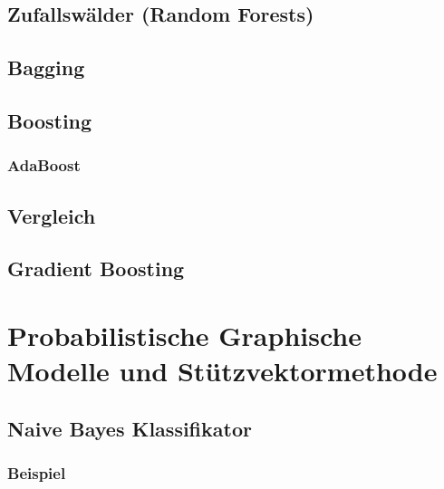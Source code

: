 	\section{Zufallswälder (Random Forests)} %

	\section{Bagging} %

	\section{Boosting} %

		\subsection{AdaBoost} %

	\section{Vergleich} %

	\section{Gradient Boosting} %

\chapter{Probabilistische Graphische Modelle und Stützvektormethode} %

	\section{Naive Bayes Klassifikator} %

		\subsection{Beispiel} %

